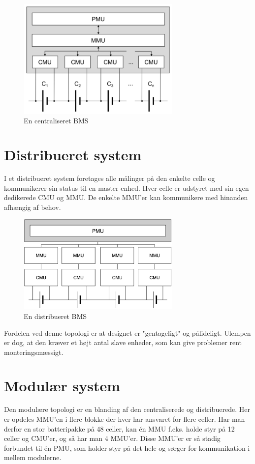 \begin{figure}[h]
	\centering
	\includegraphics[width=8cm]{billeder/centralized.png}
	\caption{En centraliseret BMS}
	\label{fig:centralized_BMS}
\end{figure}

\section{Distribueret system}
I et distribueret system foretages alle målinger på den enkelte celle og kommunikerer sin status til en master enhed. Hver celle er udstyret med sin egen dedikerede CMU og MMU. De enkelte MMU'er kan kommunikere med hinanden afhængig af behov. \\

\begin{figure}[h]
	\centering
	\includegraphics[width=8cm]{billeder/distributed.png}
	\caption{En distribueret BMS}
	\label{fig:distributed_BMS}
\end{figure}

Fordelen ved denne topologi er at designet er "gentageligt" og pålideligt. Ulempen er dog, at den kræver et højt antal slave enheder, som kan give problemer rent monteringsmæssigt.

\section{Modulær system}
Den modulære topologi er en blanding af den centraliserede og distribuerede. Her er opdeles MMU'en i flere blokke der hver har ansvaret for flere celler. Har man derfor en stor batteripakke på 48 celler, kan én MMU f.eks. holde styr på 12 celler og CMU'er, og så har man 4 MMU'er. Disse MMU'er er så stadig forbundet til én PMU, som holder styr på det hele og sørger for kommunikation i mellem modulerne. \\

